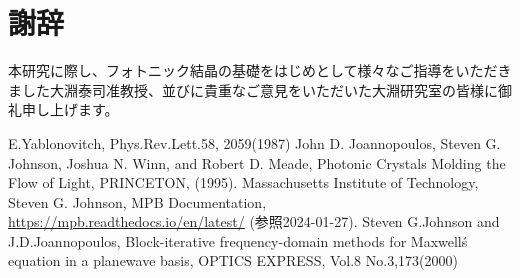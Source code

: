 \documentclass[a4paper,11pt,dvipdfmx]{jsreport}
\begin{document}
\tableofcontents






\chapter*{謝辞}
本研究に際し、フォトニック結晶の基礎をはじめとして様々なご指導をいただきました大淵泰司准教授、並びに貴重なご意見をいただいた大淵研究室の皆様に御礼申し上げます。



\begin{thebibliography}{2}
   E.Yablonovitch, Phys.Rev.Lett.58, 2059(1987)
   John D. Joannopoulos, Steven G. Johnson, Joshua N. Winn, and Robert D. Meade, Photonic Crystals Molding the Flow of Light, PRINCETON, (1995).
   Massachusetts Institute of Technology, Steven G. Johnson,  MPB Documentation,
  \\ \url{https://mpb.readthedocs.io/en/latest/}  (参照2024-01-27).
   Steven G.Johnson and J.D.Joannopoulos, Block-iterative frequency-domain methods
  for Maxwell\'s equation in a planewave basis, OPTICS EXPRESS, Vol.8 No.3,173(2000)
\end{thebibliography}
\end{document}
